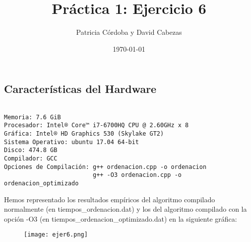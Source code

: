 \documentclass{article}
\begin{document}
\title{Práctica 1: Ejercicio 6}
\author{Patricia Córdoba y David Cabezas}
\date{\today}
\maketitle

\subsection*{Características del Hardware}
\begin{verbatim}

Memoria: 7.6 GiB
Procesador: Intel® Core™ i7-6700HQ CPU @ 2.60GHz x 8
Gráfica: Intel® HD Graphics 530 (Skylake GT2)
Sistema Operativo: ubuntu 17.04 64-bit
Disco: 474.8 GB
Compilador: GCC
Opciones de Compilación: g++ ordenacion.cpp -o ordenacion
                         g++ -O3 ordenacion.cpp -o ordenacion_optimizado

\end{verbatim}

\begin{justify}
  Hemos representado los resultados empíricos del algoritmo compilado
  normalmente (en tiempos\_ordenacion.dat) y los del algoritmo
  compilado con la opción -O3 (en tiempos\_ordenacion\_optimizado.dat)
  en la siguiente gráfica:
\end{justify}

\begin{figure}[H]
  \centering
  \texttt{[image: ejer6.png]}
\end{figure}
\end{document}
